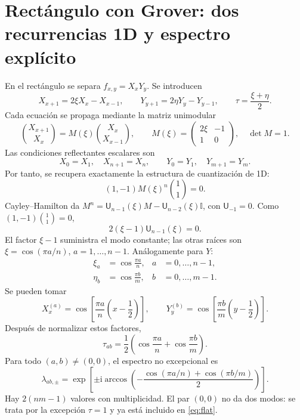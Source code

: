 \documentclass[11pt,a4paper]{article}
\newcommand{\ii}{\mathrm i}
\newcommand{\Id}{\mathbb I}
\newcommand{\Uch}{\mathsf U}
\numberwithin{equation}{section}
\begin{document}
\section{Rectángulo con Grover: dos recurrencias 1D y espectro explícito}
En el rectángulo se separa $f_{x,y}=X_xY_y$. Se introducen
\begin{equation}\label{eq:separated}
 X_{x+1}=2\xi X_x-X_{x-1},\qquad
 Y_{y+1}=2\eta Y_y-Y_{y-1},\qquad
 \tau=\frac{\xi+\eta}{2}.
\end{equation}
Cada ecuación se propaga mediante la matriz unimodular
\begin{equation}\label{eq:Tscalar}
 \binom{X_{x+1}}{X_x}
 =M(\xi)\binom{X_x}{X_{x-1}},\qquad
 M(\xi)=\begin{pmatrix}2\xi&-1\\1&0\end{pmatrix},\quad \det M=1.
\end{equation}
Las condiciones reflectantes escalares son
\begin{equation}
 X_0=X_1,\quad X_{n+1}=X_n,\qquad
 Y_0=Y_1,\quad Y_{m+1}=Y_m.
\end{equation}
Por tanto, se recupera exactamente la estructura de cuantización de 1D:
\begin{equation}
 (1,-1)M(\xi)^n\binom11=0.
\end{equation}
Cayley--Hamilton da $M^n=\Uch_{n-1}(\xi)M-\Uch_{n-2}(\xi)\Id$, con $\Uch_{-1}=0$. Como $(1,-1)\binom11=0$,
\begin{equation}\label{eq:quantScalar}
 \boxed{2(\xi-1)\Uch_{n-1}(\xi)=0.}
\end{equation}
El factor $\xi-1$ suministra el modo constante; las otras raíces son $\xi=\cos(\pi a/n)$, $a=1,\ldots,n-1$. Análogamente para $Y$:
\begin{align}
 \xi_a&=\cos\frac{\pi a}{n},& a&=0,\ldots,n-1,\\
 \eta_b&=\cos\frac{\pi b}{m},& b&=0,\ldots,m-1.
\end{align}
Se pueden tomar
\begin{equation}
 X_x^{(a)}=\cos\!\left[\frac{\pi a}{n}\left(x-\frac12\right)\right],\qquad
 Y_y^{(b)}=\cos\!\left[\frac{\pi b}{m}\left(y-\frac12\right)\right].
\end{equation}
Después de normalizar estos factores,
\begin{equation}\label{eq:tauRect}
 \tau_{ab}=\frac12\left(\cos\frac{\pi a}{n}+\cos\frac{\pi b}{m}\right).
\end{equation}
Para todo $(a,b)\ne(0,0)$, el espectro no excepcional es
\begin{equation}\label{eq:bandRect}
 \boxed{\lambda_{ab,\pm}=
 \exp\!\left[\pm\ii\arccos\!\left(
 -\frac{\cos(\pi a/n)+\cos(\pi b/m)}2\right)\right].}
\end{equation}
Hay $2(nm-1)$ valores con multiplicidad. El par $(0,0)$ no da dos modos: se trata por la excepción $\tau=1$ y ya está incluido en \eqref{eq:flat}.
\end{document}
